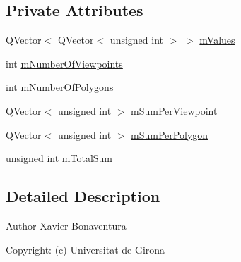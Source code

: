 \subsection*{Private Attributes}
\begin{DoxyCompactItemize}
\item 
Q\+Vector$<$ Q\+Vector$<$ unsigned int $>$ $>$ \hyperlink{class_projected_areas_matrix_ac47120ea675fc0153e7ee8a05d4a7ac6}{m\+Values}
\item 
int \hyperlink{class_projected_areas_matrix_a392583dc3a94e28e070e652a38b92076}{m\+Number\+Of\+Viewpoints}
\item 
int \hyperlink{class_projected_areas_matrix_a7b6677b16763d126f451e44b5aa98711}{m\+Number\+Of\+Polygons}
\item 
Q\+Vector$<$ unsigned int $>$ \hyperlink{class_projected_areas_matrix_a1eb9055173a5a45b00f560f33f20bd6f}{m\+Sum\+Per\+Viewpoint}
\item 
Q\+Vector$<$ unsigned int $>$ \hyperlink{class_projected_areas_matrix_afe1ccde064a456030a532b3e3ff9d72b}{m\+Sum\+Per\+Polygon}
\item 
unsigned int \hyperlink{class_projected_areas_matrix_a5cc3d0fedfb1071ea8849511050e3379}{m\+Total\+Sum}
\end{DoxyCompactItemize}


\subsection{Detailed Description}
\begin{DoxyAuthor}{Author}
Xavier Bonaventura 

Copyright\+: (c) Universitat de Girona 
\end{DoxyAuthor}


